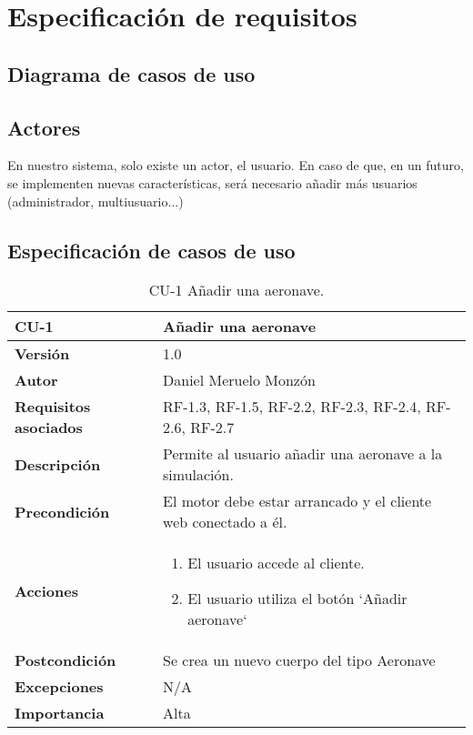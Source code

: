 \section{Especificación de requisitos}
\subsection{Diagrama de casos de uso}
\subsection{Actores}
En nuestro sistema, solo existe un actor, el usuario. En caso de que, en un futuro, se implementen nuevas características, será necesario añadir más usuarios (administrador, multiusuario...)
\subsection{Especificación de casos de uso}
\begin{table}[p]
	\centering
	\begin{tabularx}{\linewidth}{ p{} p{} }
		\toprule
		\textbf{CU-1}    & \textbf{Añadir una aeronave}\\
		\toprule
		\textbf{Versión}              & 1.0    \\
		\textbf{Autor}                & Daniel Meruelo Monzón \\
		\textbf{Requisitos asociados} & RF-1.3, RF-1.5, RF-2.2, RF-2.3, RF-2.4, RF-2.6, RF-2.7 \\
		\textbf{Descripción}          & Permite al usuario añadir una aeronave a la simulación. \\
		\textbf{Precondición}         & El motor debe estar arrancado y el cliente web conectado a él. \\
		\textbf{Acciones}             &
		\begin{enumerate}
			\def\labelenumi{\arabic{enumi}.}
			\tightlist
			\item El usuario accede al cliente.
			\item El usuario utiliza el botón `Añadir aeronave`
		\end{enumerate}\\
		\textbf{Postcondición}        & Se crea un nuevo cuerpo del tipo Aeronave \\
		\textbf{Excepciones}          & N/A \\
		\textbf{Importancia}          & Alta\\
		\bottomrule
	\end{tabularx}
	\caption{CU-1 Añadir una aeronave.}
\end{table}
